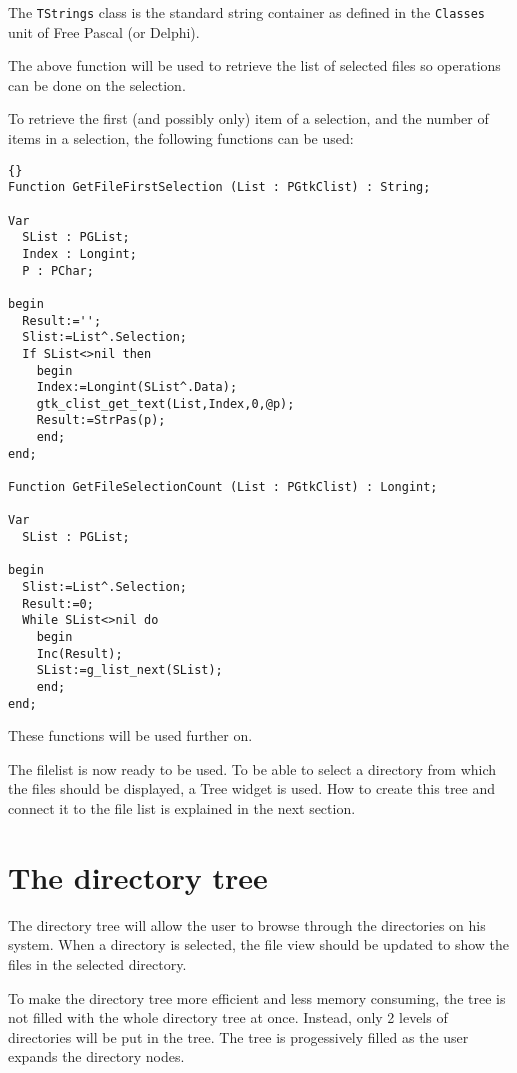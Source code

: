 \documentclass[10pt]{article}
\begin{document}
The \lstinline|TStrings| class is the standard string container as defined
in the \lstinline|Classes| unit of Free Pascal (or Delphi).

The above function will be used to retrieve the list of selected files so
operations can be done on the selection.

To retrieve the first (and possibly only) item of a selection, and the
number of items in a selection, the following functions can be used:
\begin{lstlisting}{}
Function GetFileFirstSelection (List : PGtkClist) : String;

Var
  SList : PGList;
  Index : Longint;
  P : PChar;
  
begin
  Result:='';
  Slist:=List^.Selection;
  If SList<>nil then
    begin
    Index:=Longint(SList^.Data);
    gtk_clist_get_text(List,Index,0,@p);
    Result:=StrPas(p);
    end;
end;

Function GetFileSelectionCount (List : PGtkClist) : Longint;

Var
  SList : PGList;
  
begin
  Slist:=List^.Selection;
  Result:=0;
  While SList<>nil do
    begin
    Inc(Result);
    SList:=g_list_next(SList);
    end;
end;
\end{lstlisting}
These functions will be used further on.

The filelist is now ready to be used. To be able to select a directory from
which the files should be displayed, a Tree widget is used. How to create
this tree and connect it to the file list is explained in the next section.

\section{The directory tree}
The directory tree will allow the user to browse through the directories on
his system. When a directory is selected, the file view should be updated 
to show the files in the selected directory.

To make the directory tree more efficient and less memory consuming, the
tree is not filled with the whole directory tree at once. Instead, only 2
levels of directories will be put in the tree. The tree is progessively
filled as the user expands the directory nodes. 
\end{document}
